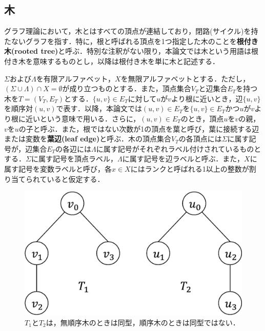 \subsection{木}
グラフ理論において，木とはすべての頂点が連結しており，閉路(サイクル)を持たないグラフを指す．特に，根と呼ばれる頂点を1つ指定した木のことを\textbf{根付き木(rooted tree)}と呼ぶ．特別な注釈がない限り，本論文では木という用語は根付き木を意味するものとし，以降は根付き木を単に木と記述する．

$\Sigma$および$\Lambda$を有限アルファベット，$X$を無限アルファベットとする．ただし，$(\Sigma\cup\Lambda)\cap X=\emptyset$が成り立つものとする．また，頂点集合$V_T$と辺集合$E_T$を持つ木を$T = (V_T, E_T)$とする．$\{u,v\}\in E_T$に対して$u$が$v$より根に近いとき，辺$\{u,v\}$を順序対$(u,v)$で表す．以降，本論文では$(u,v)\in E_T$を$\{u,v\}\in E_T$かつ$u$が$v$より根に近いという意味で用いる．さらに，$(u,v)\in E_T$のとき，頂点$u$を$v$の親，$v$を$u$の子と呼ぶ．また，根ではない次数が1の頂点を葉と呼び，葉に接続する辺または変数を\textbf{葉辺(leaf edge)}と呼ぶ．木の頂点集合$V_T$の各頂点には$\Sigma$に属す記号が，辺集合$E_T$の各辺には$\Lambda$に属す記号がそれぞれラベル付けされているものとする．$\Sigma$に属す記号を頂点ラベル，$\Lambda$に属す記号を辺ラベルと呼ぶ．また，$X$に属す記号を変数ラベルと呼び，各$x \in X$にはランクと呼ばれる1以上の整数が割り当てられていると仮定する．

\begin{figure}[tb]
  \centering
  \includegraphics[scale=0.28]{fig/fig-sibling_relationship.eps}
  \caption{$T_1$と$T_2$は，無順序木のときは同型，順序木のときは同型ではない．}\label{fig:sibling_relationship}
\end{figure}



